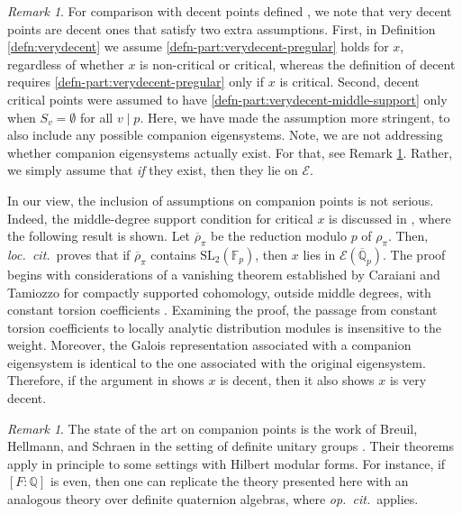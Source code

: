 \documentclass[10pt, twoside]{amsart}
\theoremstyle{plain}
\theoremstyle{definition}
\theoremstyle{remark}
\newtheorem{remark}[theorem]{Remark}
\numberwithin{equation}{subsection}
\def\Q{\mathbb Q}
\def\F{\mathbb{F}}
\def\SL{\mathrm{SL}}
\def\scre{\mathscr E}
\def\qpbar{\overline{\mathbb Q}_p}
\begin{document}
\begin{remark}
For comparison with decent points defined  \cite[Definition 1.5.2]{BH}, we note that very decent points are decent ones that satisfy two extra assumptions. First, in Definition \ref{defn:verydecent} we assume \ref{defn-part:verydecent-pregular} holds for $x$, regardless of whether $x$ is non-critical or critical, whereas the definition of decent requires \ref{defn-part:verydecent-pregular} only if $x$ is critical. Second, decent critical points were assumed to have \ref{defn-part:verydecent-middle-support} only when $S_v = \emptyset$ for all $v \mid p$. Here, we have made the assumption more stringent, to also include any possible companion eigensystems. Note, we are not addressing whether companion eigensystems actually exist. For that, see Remark \ref{remark:BHS}. Rather, we simply assume that {\em if} they exist, then they lie on $\scre$.

In our view, the inclusion of assumptions on companion points is not serious. Indeed, the middle-degree support condition for critical $x$ is discussed in \cite[Appendix B]{BH}, where the following result is shown. Let $\overline{\rho}_\pi$ be the reduction modulo $p$ of $\rho_{\pi}$. Then, {\em loc.\ cit.}\ proves that if $\overline{\rho}_\pi$ contains $\SL_2(\F_p)$, then $x$ lies in $\scre(\qpbar)$. The proof begins with considerations of a vanishing theorem established by Caraiani and Tamiozzo for compactly supported cohomology, outside middle degrees, with constant torsion coefficients \cite{CaraianiTamiozzo-HilbertVanishing}. Examining the proof, the passage from constant torsion coefficients to locally analytic distribution modules is insensitive to the weight. Moreover, the Galois representation associated with a companion eigensystem is identical to the one associated with the original eigensystem. Therefore, if the argument in \cite[Appendix B]{BH} shows $x$ is decent, then it also shows $x$ is very decent.
\end{remark}

\begin{remark}\label{remark:BHS}
The state of the art on companion points is the work of Breuil, Hellmann, and Schraen  in the setting of definite unitary groups \cite{BreuilHellmannSchraen-LocalModel}. Their theorems apply in principle to some settings with Hilbert modular forms. For instance, if $[F:\Q]$ is even, then one can replicate the theory presented here with an analogous theory over definite quaternion algebras, where {\em op.\ cit.}\ applies.
\end{remark}  
\end{document}
